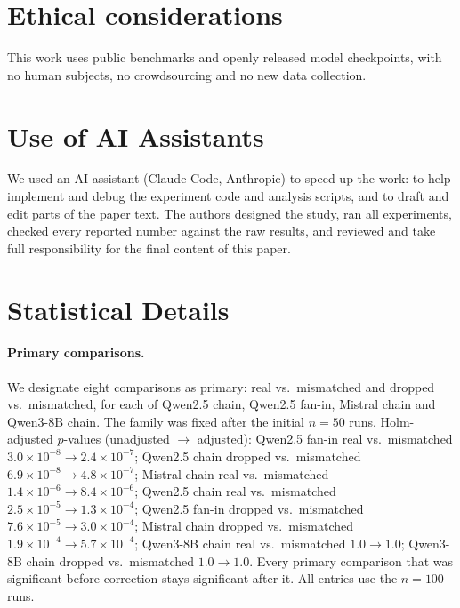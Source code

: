 \documentclass[11pt]{article}
\begin{document}
\section*{Ethical considerations}

This work uses public benchmarks and openly
released model checkpoints, with no human subjects, no crowdsourcing and no new
data collection.

\section*{Use of AI Assistants}

We used an AI assistant (Claude Code, Anthropic) to speed up the work: to help
implement and debug the experiment code and analysis scripts, and to draft and edit
parts of the paper text. The authors designed the study, ran all experiments,
checked every reported number against the raw results, and reviewed and take full
responsibility for the final content of this paper.





\appendix

\section{Statistical Details}
\label{app:stats}

\paragraph{Primary comparisons.} We designate eight comparisons as primary:
real vs.\ mismatched and dropped vs.\ mismatched, for each of Qwen2.5 chain,
Qwen2.5 fan-in, Mistral chain and Qwen3-8B chain. The family was fixed after
the initial $n{=}50$ runs. Holm-adjusted $p$-values (unadjusted $\to$
adjusted): Qwen2.5 fan-in real vs.\ mismatched $3.0\times10^{-8}\to
2.4\times10^{-7}$; Qwen2.5 chain dropped vs.\ mismatched $6.9\times10^{-8}\to
4.8\times10^{-7}$; Mistral chain real vs.\ mismatched $1.4\times10^{-6}\to
8.4\times10^{-6}$; Qwen2.5 chain real vs.\ mismatched $2.5\times10^{-5}\to
1.3\times10^{-4}$; Qwen2.5 fan-in dropped vs.\ mismatched $7.6\times10^{-5}\to
3.0\times10^{-4}$; Mistral chain dropped vs.\ mismatched $1.9\times10^{-4}\to
5.7\times10^{-4}$; Qwen3-8B chain real vs.\ mismatched $1.0\to1.0$; Qwen3-8B
chain dropped vs.\ mismatched $1.0\to1.0$. Every primary comparison that was
significant before correction stays significant after it. All entries use the
$n{=}100$ runs.
\end{document}
